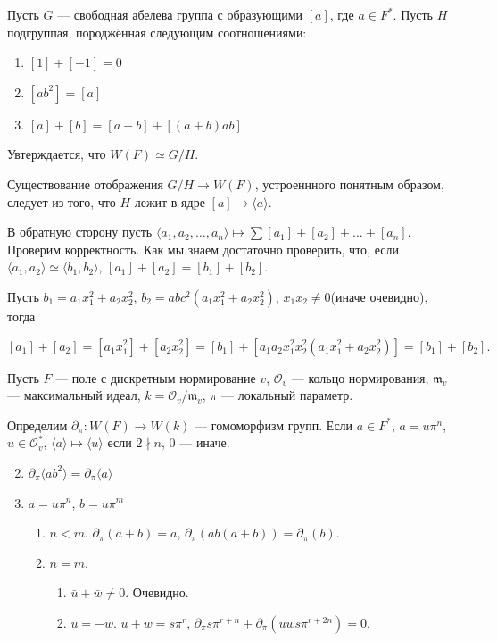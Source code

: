 \documentclass{article}
\theoremstyle{definition}
\theoremstyle{remark}
\renewcommand{\O}{\mathcal{O}}
\newcommand{\m}{\mathfrak{m}}
\begin{document}
Пусть $G$ --- свободная абелева группа с образующими $[a]$, где $a \in F^*$. Пусть $H$ подгруппая, породжённая следующим соотношениями:
\begin{enumerate}[nosep, wide, label = \arabic*)]
    \item $[1] + [-1] = 0$
    \item $[ab^2] = [a]$
    \item $[a] + [b] = [a + b] + [(a + b)ab]$
\end{enumerate}
Увтерждается, что $W(F) \simeq G / H$.

Существование отображения $G / H \rightarrow W(F)$, устроеннного понятным образом, следует из того, что $H$ лежит в ядре $[a] \rightarrow \langle a \rangle$.

В обратную сторону пусть $\langle a_1, a_2, \ldots, a_n \rangle \mapsto \sum [a_1] + [a_2] + \ldots + [a_n]$. Проверим корректность. Как мы знаем достаточно проверить, что, если $\langle a_1, a_2 \rangle \simeq \langle b_1, b_2 \rangle$, $[a_1] + [a_2] = [b_1] + [b_2]$.

Пусть $b_1 = a_1x_1^2 + a_2x_2^2$, $b_2 = abc^2(a_1x_1^2 + a_2x_2^2)$, $x_1x_2 \neq 0$(иначе очевидно), тогда 

$$[a_1] + [a_2] = [a_1x_1^2] + [a_2x_2^2] = [b_1] + [a_1a_2x_1^2x_2^2(a_1x_1^2 + a_2x_2^2)] = [b_1] + [b_2].$$

Пусть $F$ --- поле с дискретным нормирование $v$, $\O_v$ --- кольцо нормирования, $\m_v$ --- максимальный идеал, $k = \O_v / \m_v$, $\pi$ --- локальный параметр. 

Определим $\partial_\pi: W(F) \rightarrow W(k)$ ---  гомоморфизм групп. Если $a \in F^*$, $a = u \pi^n$, $u \in \O_v^*$, $\langle a \rangle \mapsto \langle u \rangle$ если $2 \nmid n$, 0 --- иначе.

\begin{enumerate}[nosep, wide, label = \arabic*)]
    \setcounter{enumi}{1}
    \item $\partial_\pi \langle ab^2 \rangle = \partial_\pi \langle a \rangle$
    \item $a = u \pi^n$, $b = u \pi^m$
    \begin{enumerate}[nosep, wide, label = \arabic{enumi}\alph*)]
        \item $n < m$. $\partial_\pi (a + b) = a$, $\partial_\pi (ab(a + b)) = \partial_\pi(b)$.
        \item $n = m$. 
        \begin{enumerate}
            \item $\bar{u} + \bar{w} \neq 0$. Очевидно.
            \item $\bar{u} = -\bar{w}$. $u + w = s \pi^r$, $\partial_\pi{s \pi^{r + n}} + \partial_\pi(uws \pi^{r + 2n}) = 0$.
        \end{enumerate}
    \end{enumerate}
\end{enumerate}
\end{document}
